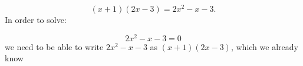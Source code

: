     \begin{equation}
    \left(x+1\right)\left(2x-3\right)=2{x}^{2}-x-3.\tag{9.17}
      \end{equation}
      \label{m39247*id149552}In order to solve:\par 
      \label{m39247*id149557}\nopagebreak\noindent{}
        
    \begin{equation}
    2{x}^{2}-x-3=0\tag{9.18}
      \end{equation}
      \label{m39247*id149590}we need to be able to write $2{x}^{2}-x-3$ as $\left(x+1\right)\left(2x-3\right)$, which we already know
%             
%         
%       
% 
      \label{m39247*uid36}
